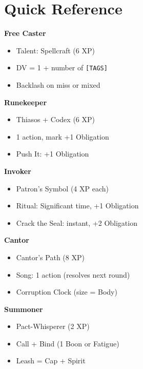 \section{Quick Reference}
\label{sec:magic-quickref}

\begin{tcolorbox}[colback=black!3,colframe=black!40!white,title=Magic Quick Reference,fonttitle=\bfseries]
\textbf{Free Caster}
\begin{itemize}
  \item Talent: Spellcraft (6 XP)
  \item DV = 1 + number of \texttt{[TAGS]}
  \item Backlash on miss or mixed
\end{itemize}

\textbf{Runekeeper}
\begin{itemize}
  \item Thiasos + Codex (6 XP)
  \item 1 action, mark +1 Obligation
  \item Push It: +1 Obligation
\end{itemize}

\textbf{Invoker}
\begin{itemize}
  \item Patron’s Symbol (4 XP each)
  \item Ritual: Significant time, +1 Obligation
  \item Crack the Seal: instant, +2 Obligation
\end{itemize}

\textbf{Cantor}
\begin{itemize}
  \item Cantor’s Path (8 XP)
  \item Song: 1 action (resolves next round)
  \item Corruption Clock (size = Body)
\end{itemize}

\textbf{Summoner}
\begin{itemize}
  \item Pact-Whisperer (2 XP)
  \item Call + Bind (1 Boon or Fatigue)
  \item Leash = Cap + Spirit
\end{itemize}
\end{tcolorbox}